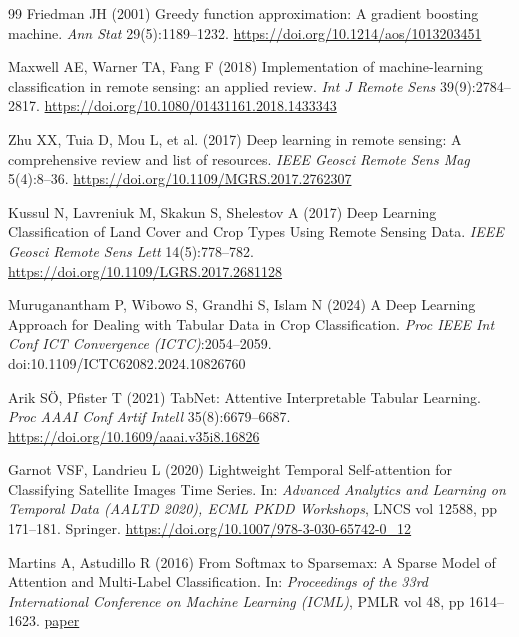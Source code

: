 \documentclass[pdflatex,sn-mathphys]{sn-jnl} %
\begin{document}
\begin{thebibliography}{99}
Friedman JH (2001) Greedy function approximation: A gradient boosting machine. \textit{Ann Stat} 29(5):1189--1232. \href{https://doi.org/10.1214/aos/1013203451}{https://doi.org/10.1214/aos/1013203451}

Maxwell AE, Warner TA, Fang F (2018) Implementation of machine-learning classification in remote sensing: an applied review. \textit{Int J Remote Sens} 39(9):2784--2817. \href{https://doi.org/10.1080/01431161.2018.1433343}{https://doi.org/10.1080/01431161.2018.1433343}

Zhu XX, Tuia D, Mou L, et al. (2017) Deep learning in remote sensing: A comprehensive review and list of resources. \textit{IEEE Geosci Remote Sens Mag} 5(4):8--36. \href{https://doi.org/10.1109/MGRS.2017.2762307}{https://doi.org/10.1109/MGRS.2017.2762307}


Kussul N, Lavreniuk M, Skakun S, Shelestov A (2017) Deep Learning Classification of Land Cover and Crop Types Using Remote Sensing Data. \textit{IEEE Geosci Remote Sens Lett} 14(5):778--782. \href{https://doi.org/10.1109/LGRS.2017.2681128}{https://doi.org/10.1109/LGRS.2017.2681128}

Muruganantham P, Wibowo S, Grandhi S, Islam N (2024) A Deep Learning Approach for Dealing with Tabular Data in Crop Classification. \textit{Proc IEEE Int Conf ICT Convergence (ICTC)}:2054--2059. doi:10.1109/ICTC62082.2024.10826760

Arik SÖ, Pfister T (2021) TabNet: Attentive Interpretable Tabular Learning. \textit{Proc AAAI Conf Artif Intell} 35(8):6679--6687. \href{https://doi.org/10.1609/aaai.v35i8.16826}{https://doi.org/10.1609/aaai.v35i8.16826}

Garnot VSF, Landrieu L (2020) Lightweight Temporal Self-attention for Classifying Satellite Images Time Series. In: \textit{Advanced Analytics and Learning on Temporal Data (AALTD 2020), ECML PKDD Workshops}, LNCS vol 12588, pp 171--181. Springer. \href{https://doi.org/10.1007/978-3-030-65742-0_12}{https://doi.org/10.1007/978-3-030-65742-0\_12}

Martins A, Astudillo R (2016) From Softmax to Sparsemax: A Sparse Model of Attention and Multi-Label Classification. In: \textit{Proceedings of the 33rd International Conference on Machine Learning (ICML)}, PMLR vol 48, pp 1614--1623. \href{https://proceedings.mlr.press/v48/martins16.html}{paper}


\end{thebibliography}
\end{document}
